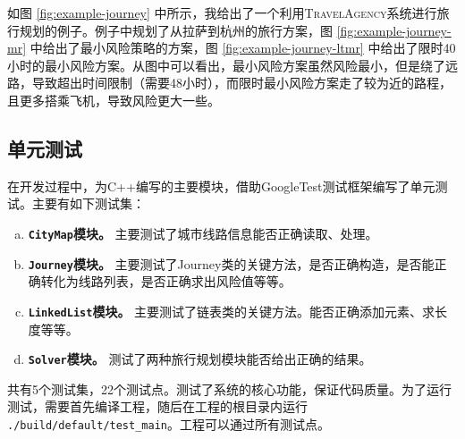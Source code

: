 如图 \ref{fig:example-journey} 中所示，我给出了一个利用\textsc{TravelAgency}系统进行旅行规划的例子。例子中规划了从拉萨到杭州的旅行方案，图 \ref{fig:example-journey-mr} 中给出了最小风险策略的方案，图 \ref{fig:example-journey-ltmr} 中给出了限时40小时的最小风险方案。从图中可以看出，最小风险方案虽然风险最小，但是绕了远路，导致超出时间限制（需要48小时），而限时最小风险方案走了较为近的路程，且更多搭乘飞机，导致风险更大一些。

\subsection{单元测试}

在开发过程中，为C++编写的主要模块，借助GoogleTest测试框架编写了单元测试。主要有如下测试集：
\begin{enumerate}[(a)]
  \item \textbf{\lstinline{CityMap}模块。} 主要测试了城市线路信息能否正确读取、处理。
  \item \textbf{\lstinline{Journey}模块。} 主要测试了Journey类的关键方法，是否正确构造，是否能正确转化为线路列表，是否正确求出风险值等等。
  \item \textbf{\lstinline{LinkedList}模块。} 主要测试了链表类的关键方法。能否正确添加元素、求长度等等。
  \item \textbf{\lstinline{Solver}模块。} 测试了两种旅行规划模块能否给出正确的结果。
\end{enumerate}
共有5个测试集，22个测试点。测试了系统的核心功能，保证代码质量。为了运行测试，需要首先编译工程，随后在工程的根目录内运行 \texttt{./build/default/test\_main}。工程可以通过所有测试点。









